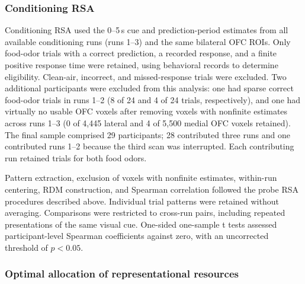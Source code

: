 \documentclass[9pt,twoside,lineno]{pnas-new}
\begin{document}
\subsubsection*{Conditioning RSA}

Conditioning RSA used the 0--5\,s cue and prediction-period estimates from all available conditioning runs (runs 1--3) and the same bilateral OFC ROIs. Only food-odor trials with a correct prediction, a recorded response, and a finite positive response time were retained, using behavioral records to determine eligibility. Clean-air, incorrect, and missed-response trials were excluded. Two additional participants were excluded from this analysis: one had sparse correct food-odor trials in runs 1--2 (8 of 24 and 4 of 24 trials, respectively), and one had virtually no usable OFC voxels after removing voxels with nonfinite estimates across runs 1--3 (0 of 4,445 lateral and 4 of 5,500 medial OFC voxels retained). The final sample comprised 29 participants; 28 contributed three runs and one contributed runs 1--2 because the third scan was interrupted. Each contributing run retained trials for both food odors.

Pattern extraction, exclusion of voxels with nonfinite estimates, within-run centering, RDM construction, and Spearman correlation followed the probe RSA procedures described above. Individual trial patterns were retained without averaging. Comparisons were restricted to cross-run pairs, including repeated presentations of the same visual cue. One-sided one-sample t tests assessed participant-level Spearman coefficients against zero, with an uncorrected threshold of $p < 0.05$.

\subsubsection*{Optimal allocation of representational resources}
\end{document}
